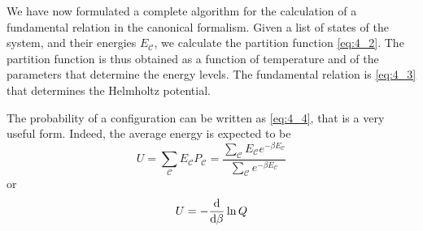 \documentclass[../main/main.tex]{subfiles}
\begin{document}
We have now formulated a complete algorithm for the calculation of a fundamental relation in the canonical formalism. Given a list of states of the system, and their energies \( E_ {\mathcal{C}} \), we calculate the partition function \eqref{eq:4_2}. The partition function is thus obtained as a function of temperature and of the parameters that determine the energy levels. The fundamental relation is \eqref{eq:4_3} that determines the Helmholtz potential.

The probability of a configuration can be written as \eqref{eq:4_4}, that is a very useful form. Indeed, the average energy is expected to be
\begin{equation}
  U = \sum_{\mathcal{C}}^{} E_ {\mathcal{C}} P_{\mathcal{C}}  = \frac{ \sum_{\mathcal{C}}^{} E_ {\mathcal{C}} e^{-\beta E_ \mathcal{C}}}{\sum_{\mathcal{C}}^{} e^{-\beta E_ \mathcal{C}} }
\end{equation}
or
\begin{equation}
  U = -\dv{}{\beta } \ln{Q}
\end{equation}
\end{document}
